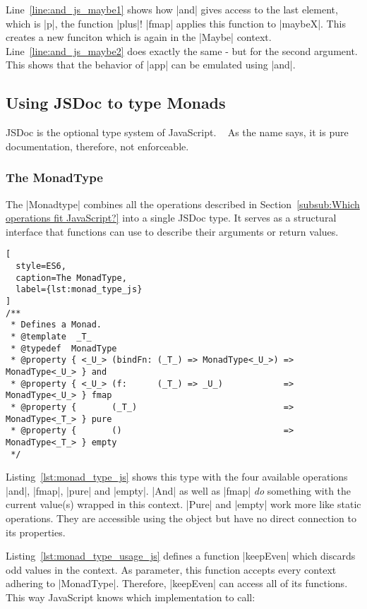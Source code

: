 Line~\ref{line:and_js_maybe1} shows how |and| gives access to the last element,
which is |p|, the function |plus|! |fmap| applies this function to |maybeX|.
This creates a new funciton which is again in the |Maybe| context.\\
Line~\ref{line:and_js_maybe2} does exactly the same - but for the second
argument. \\ 
This shows that the behavior of |app| can be emulated using |and|.

\subsection{Using JSDoc to type Monads} %
\label{sub:Using JSDoc to type monads}
JSDoc is the optional type system of JavaScript. ~\cite{jsdoc_use_2023}  As the
name says, it is pure documentation, therefore, not enforceable.

\subsubsection{The MonadType} %
\label{subsub:The MonadType}
The |Monadtype| combines all the operations described in
Section~\ref{subsub:Which operations fit JavaScript?} into a single JSDoc type.
It serves as a structural interface that functions can use to describe their
arguments or return values.

\begin{lstlisting}[
  style=ES6,
  caption=The MonadType,
  label={lst:monad_type_js}
]
/**
 * Defines a Monad.
 * @template  _T_
 * @typedef  MonadType
 * @property { <_U_> (bindFn: (_T_) => MonadType<_U_>) => MonadType<_U_> } and
 * @property { <_U_> (f:      (_T_) => _U_)            => MonadType<_U_> } fmap
 * @property {       (_T_)                             => MonadType<_T_> } pure
 * @property {       ()                                => MonadType<_T_> } empty
 */
\end{lstlisting}

Listing~\ref{lst:monad_type_js} shows this type with the four available
operations |and|, |fmap|, |pure| and |empty|. |And| as well as |fmap| \textit{do}
something with the current value(s) wrapped in this context. |Pure| and |empty|
work more like static operations. They are accessible using the object but have
no direct connection to its properties. 

Listing~\ref{lst:monad_type_usage_js} defines a function |keepEven| which
discards odd values in the context. As parameter, this function accepts every context
adhering to |MonadType|. Therefore, |keepEven| can access all of
its functions. This way JavaScript knows which implementation to call:

